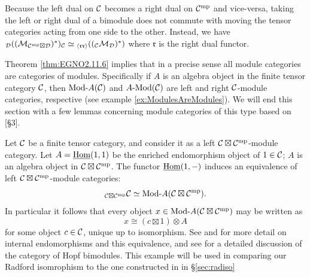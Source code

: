 \documentclass{amsart}
\begin{document}
\begin{warning} \label{warning:DualTwist}
Because the left dual on $\mathcal C$ becomes a right dual on $\mathcal C^{\mathrm{mp}}$ and vice-versa, taking the left or right dual of a bimodule does not commute with moving the tensor categories acting from one side to the other.  Instead, we have ${}_\mathcal D ((\mathcal M_{\mathcal C^{\mathrm{mp}} \boxtimes \mathcal D})^*)_\mathcal C \simeq {}_{\langle \mathfrak{r r} \rangle}(({}_\mathcal C \mathcal M_\mathcal D)^*)$ where $\mathfrak{r}$ is the right dual functor.%
\end{warning}

Theorem \ref{thm:EGNO2.11.6} implies that in a precise sense all module categories are categories of modules. Specifically if $A$ is an algebra object in the finite tensor category $\mathcal C$, then $\Mod{}{A}(\cC)$ and $\Mod{A}{}(\cC)$ are left and right $\mathcal C$-module categories, respective (see example \ref{ex:ModulesAreModules}). We will end this section with a few lemmas concerning module categories of this type based on \cite{MR2097289}[\S 3].

\begin{example} \label{Ex:Hopf_bimod} 
	Let $\mathcal C$ be a finite tensor category, and consider it as a left $\mathcal C \boxtimes \mathcal C^{\mathrm{mp}}$-module category. Let $A = \operatorname{\underline{Hom}}(1,1)$ be the enriched endomorphism object of $1 \in \mathcal C$; $A$ is an algebra object in $\mathcal C \boxtimes \mathcal C^{\mathrm{mp}}$.  
The functor $\operatorname{\underline{Hom}}(1, -)$ induces an 
 equivalence of left $\mathcal C \boxtimes \mathcal C^{\mathrm{mp}}$-module categories:
	\begin{equation*}
		{}_{\cC \boxtimes \cC^\mp} \cC \simeq \Mod{}{A}(\cC \boxtimes \cC^\mp).
	\end{equation*} 
In particular it follows that every object $x \in \Mod{}{A}(\cC \boxtimes \cC^\mp)$ may be written as 
\begin{equation*}
	x \cong (c \boxtimes 1) \otimes A
\end{equation*}
for some object $c \in \mathcal C$, unique up to isomorphism.  See \cite{MR1976459, EO-ftc, EGNO} and \cite[\S ~\ref{sec:conventions}--3.2]{BTP} for more detail on internal endomorphisms and this equivalence, and see \cite[\S 2]{MR2097289} for a detailed discussion of the category of Hopf bimodules.  This example will be used in comparing our Radford isomrophism to the one constructed in \cite{MR2097289} in \S \ref{sec:radiso}
\end{example}
\end{document}

